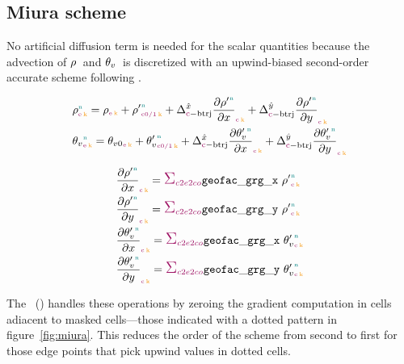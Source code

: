 \clearpage
\subsection{Miura scheme}
\label{sub:miura}
%
No artificial diffusion term is needed for the scalar quantities because the advection of $\density{}{}{}$ and $\vpotemp{}{}{}$ is discretized with an upwind-biased second-order accurate scheme following \cite{miuraUpwindBiasedConservativeAdvection2007}.

\begin{align}
  &\density{\n}{\e}{\k} = \densityref{\e}{\k} + \densityprime{\n}{\c 0/1}{\k} + \Delta^{\hat{x}}_{\c - \text{btrj}} \densityprimedx{\n}{\c}{\k} + \Delta^{\hat{y}}_{\c - \text{btrj}} \densityprimedy{\n}{\c}{\k} \\
  &\vpotemp{\n}{\e}{\k} = \vpotempref{\e}{\k} + \vpotempprime{\n}{\c 0/1}{\k} + \Delta^{\hat{x}}_{\c - \text{btrj}} \vpotempprimedx{\n}{\c}{\k} + \Delta^{\hat{y}}_{\c - \text{btrj}} \vpotempprimedy{\n}{\c}{\k}
\end{align}

\begin{align}
  & \densityprimedx{\n}{\c}{\k} = \sum_{\offProv{c2e2co}} \geofacgrgx\ \densityprime{\n}{\c}{\k} \\
  & \densityprimedy{\n}{\c}{\k} = \sum_{\offProv{c2e2co}} \geofacgrgy\ \densityprime{\n}{\c}{\k} \\
  & \vpotempprimedx{\n}{\c}{\k} = \sum_{\offProv{c2e2co}} \geofacgrgx\ \vpotempprime{\n}{\c}{\k} \\
  & \vpotempprimedy{\n}{\c}{\k} = \sum_{\offProv{c2e2co}} \geofacgrgy\ \vpotempprime{\n}{\c}{\k}
\end{align}

The \ibm\ (\IBM) handles these operations by zeroing the gradient computation in cells adiacent to masked cells---those indicated with a dotted pattern in figure~\ref{fig:miura}.
This reduces the order of the scheme from second to first for those edge points that pick upwind values in dotted cells.


